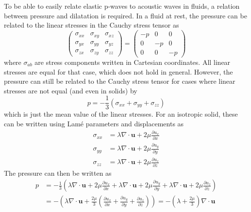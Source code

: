 \documentclass[11pt,twoside]{eitExjobb}
\begin{document}
	To be able to easily relate elastic p-waves to acoustic waves in fluids, a relation between pressure and dilatation is required. In a fluid at rest, the pressure can be related to the linear stresses in the Cauchy stress tensor as \cite{Irgens2008}
	\begin{equation*}
		\begin{pmatrix}
			\sigma_{xx} & \sigma_{xy} & \sigma_{xz} \\
			\sigma_{yx} & \sigma_{yy} & \sigma_{yz} \\
			\sigma_{zx} & \sigma_{zy} & \sigma_{zz}
		\end{pmatrix}
		=
		\begin{pmatrix}
		-p & 0 & 0 \\
		0 & -p & 0 \\
		0 & 0 & -p
		\end{pmatrix}
	\end{equation*}
	where $\sigma_{ab}$ are stress components written in Cartesian coordinates. All linear stresses are equal for that case, which does not hold in general. However, the pressure can still be related to the Cauchy stress tensor for cases where linear stresses are not equal (and even in solids) by \cite{Bertram2015}
	\begin{equation*}
		p = -\frac{1}{3}(\sigma_{xx} + \sigma_{yy} + \sigma_{zz})
	\end{equation*}
	which is just the mean value of the linear stresses. For an isotropic solid, these can be written using Lamé parameters and displacements as \cite{Schmerr2016}
	\begin{align*}
		\sigma_{xx} &= \lambda \nabla \cdot \bm{u} + 2\mu \frac{\partial u_x}{\partial x} \\
		\sigma_{yy} &= \lambda \nabla \cdot \bm{u} + 2\mu \frac{\partial u_y}{\partial y} \\
		\sigma_{zz} &= \lambda \nabla \cdot \bm{u} + 2\mu \frac{\partial u_z}{\partial z}
	\end{align*}
	The pressure can then be written as
	\begin{equation*}
	\begin{split}
		p &= -\frac{1}{3} \left(
			\lambda \nabla \cdot \bm{u} + 2\mu \frac{\partial u_x}{\partial x}
			+ \lambda \nabla \cdot \bm{u} + 2\mu \frac{\partial u_y}{\partial y}
			+ \lambda \nabla \cdot \bm{u} + 2\mu \frac{\partial u_z}{\partial z}
		\right) \\
		&= -\left(
			\lambda \nabla \cdot \bm{u} + \frac{2\mu}{3} \left( \frac{\partial u_x}{\partial x} + \frac{\partial u_y}{\partial y} + \frac{\partial u_z}{\partial z} \right)
		\right) = - \left( \lambda + \frac{2\mu}{3} \right) \nabla \cdot \bm{u}
	\end{split}
	\end{equation*}
\end{document}
